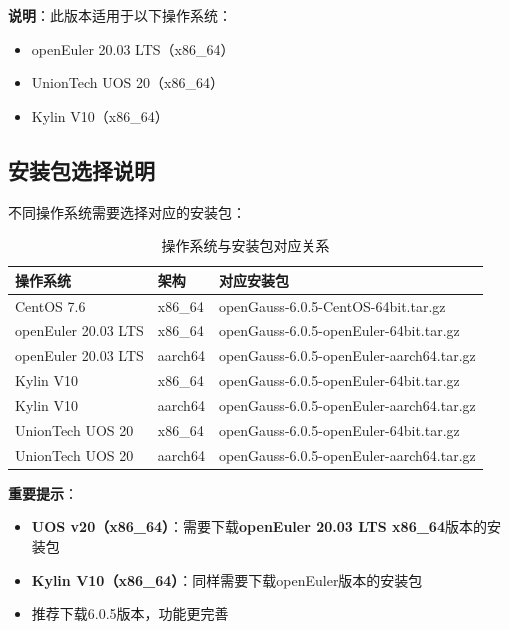 \documentclass[12pt,UTF8]{ctexbook}
\begin{document}
\textbf{说明}：此版本适用于以下操作系统：
\begin{itemize}[leftmargin=2cm]
    \item openEuler 20.03 LTS（x86\_64）
    \item UnionTech UOS 20（x86\_64）
    \item Kylin V10（x86\_64）
\end{itemize}

\subsection{安装包选择说明}

不同操作系统需要选择对应的安装包：

\begin{table}[htbp]
    \centering
    \caption{操作系统与安装包对应关系}
    \label{tab:os_package}
    \begin{tabular}{|l|l|l|}
    \hline
    \textbf{操作系统} & \textbf{架构} & \textbf{对应安装包} \\ \hline
    CentOS 7.6 & x86\_64 & openGauss-6.0.5-CentOS-64bit.tar.gz \\ \hline
    openEuler 20.03 LTS & x86\_64 & openGauss-6.0.5-openEuler-64bit.tar.gz \\ \hline
    openEuler 20.03 LTS & aarch64 & openGauss-6.0.5-openEuler-aarch64.tar.gz \\ \hline
    Kylin V10 & x86\_64 & openGauss-6.0.5-openEuler-64bit.tar.gz \\ \hline
    Kylin V10 & aarch64 & openGauss-6.0.5-openEuler-aarch64.tar.gz \\ \hline
    UnionTech UOS 20 & x86\_64 & openGauss-6.0.5-openEuler-64bit.tar.gz \\ \hline
    UnionTech UOS 20 & aarch64 & openGauss-6.0.5-openEuler-aarch64.tar.gz \\ \hline
    \end{tabular}
\end{table}

\textbf{重要提示}：

\begin{itemize}[leftmargin=2cm]
    \item \textbf{UOS v20（x86\_64）}：需要下载\textbf{openEuler 20.03 LTS x86\_64}版本的安装包
    \item \textbf{Kylin V10（x86\_64）}：同样需要下载openEuler版本的安装包
    \item 推荐下载6.0.5版本，功能更完善
\end{itemize}
\end{document}
